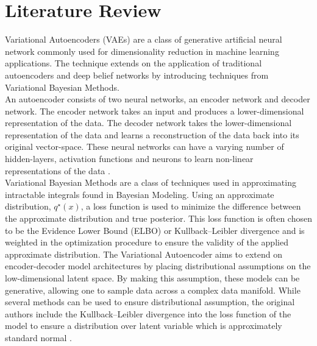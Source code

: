 \documentclass[12pt]{extarticle}
\begin{document}
\section*{Literature Review}
Variational Autoencoders (VAEs) are a class of generative artificial neural network commonly used for dimensionality reduction in machine learning applications.  The technique extends on the application of traditional autoencoders and deep belief networks by introducing techniques from Variational Bayesian Methods.  \\
\newline
An autoencoder consists of two neural networks, an encoder network and decoder network. The encoder network takes an input and produces a lower-dimensional representation of the data. The decoder network takes the lower-dimensional representation of the data and learns a reconstruction of the data back into its original vector-space. These neural networks can have a varying number of hidden-layers, activation functions and neurons to learn non-linear representations of the data \citep{Bengio2007, Bengio2013}.\\ \newline
Variational Bayesian Methods are a class of techniques used in approximating intractable integrals found in Bayesian Modeling.  Using an approximate distribution, $q^\star(x)$, a loss function is used to minimize the difference between the approximate distribution and true posterior.  This loss function is often chosen to be the Evidence Lower Bound (ELBO) or Kullback–Leibler divergence and is weighted in the optimization procedure to ensure the validity of the applied approximate distribution.   
\newline
The Variational Autoencoder aims to extend on encoder-decoder model architectures by placing distributional assumptions on the low-dimensional latent space.  By making this assumption, these models can be generative, allowing one to sample data across a complex data manifold.  While several methods can be used to ensure distributional assumption, the original authors include the Kullback–Leibler divergence into the loss function of the model to ensure a distribution over latent variable which is approximately standard normal \citep{vaeBayes, zhao2017infovae, tolstikhin2017wasserstein}.  
\\
\end{document}
